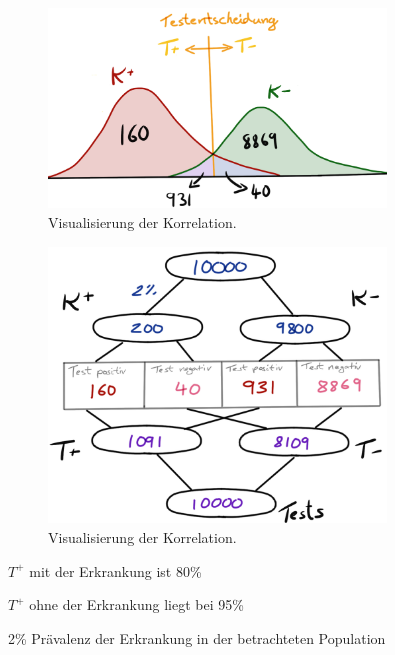 \documentclass[
  letterpaper,
  DIV=11,
  oneside]{scrreport}
\begin{document}
\begin{figure}

{\centering \includegraphics[width=0.8\textwidth,height=\textheight]{./images/diag_testen_dist.png}

}

\caption{\label{fig-stat-diag-00}Visualisierung der Korrelation.}

\end{figure}

\begin{figure}

{\centering \includegraphics[width=0.8\textwidth,height=\textheight]{./images/diag_testen_doppel.png}

}

\caption{\label{fig-stat-diag-01}Visualisierung der Korrelation.}

\end{figure}

\(T^+\) mit der Erkrankung ist 80\%

\(T^+\) ohne der Erkrankung liegt bei 95\%

2\% Prävalenz der Erkrankung in der betrachteten Population
\end{document}
